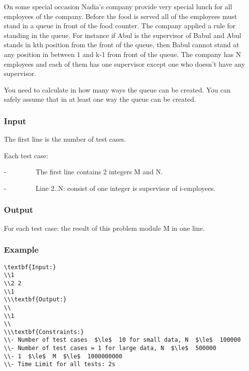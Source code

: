 



   On some special occasion Nadia’s company provide very special lunch for all employees of the company. Before the food is served all of the employees must stand in a queue in front of the food counter. The company applied a rule for standing in the queue. For instance if Abul is the supervisor of Babul and Abul stands in kth position from the front of the queue, then Babul cannot stand at any position in between 1 and k-1 from front of the queue. The company has N employees and each of them has one supervisor except one who doesn’t have any supervisor.  

   You need to calculate in how many ways the queue can be created. You can safely assume that in at least one way the queue can be created.  

\subsubsection{   Input  }

   The first line is the number of test cases.  

   Each test case:  

   -         The first line contains 2 integers M and N.  

   -         Line 2..N: consist of one integer is supervisor of i-employees.  

\subsubsection{   Output  }

   For each test case: the result of this problem module M in one line.  

\subsubsection{   Example  }
\begin{verbatim}
\textbf{Input:}
\\1
\\2 2
\\1
\\\textbf{Output:}
\\
\\1
\\
\\\textbf{Constraints:}
\\- Number of test cases  $\le$  10 for small data, N  $\le$  100000
\\- Number of test cases = 1 for large data, N  $\le$  500000
\\- 1  $\le$  M  $\le$  1000000000
\\- Time Limit for all tests: 2s\end{verbatim}
